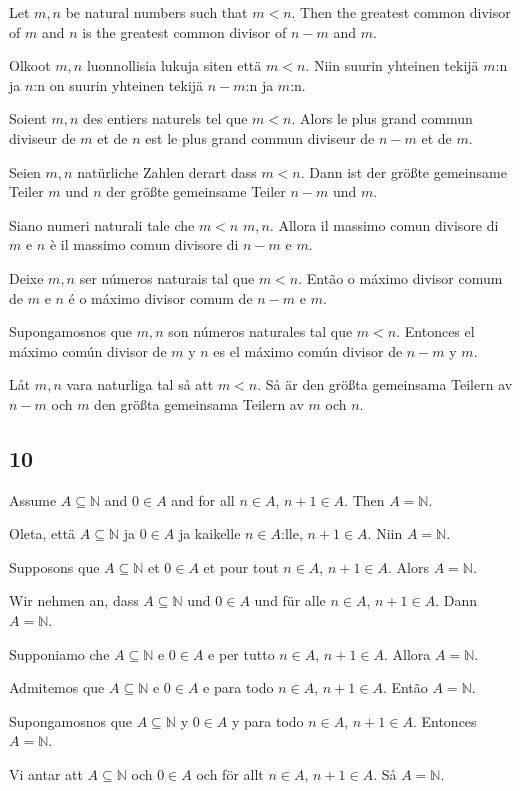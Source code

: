 \documentclass{article}
\begin{document}
Let $ m, n $ be natural numbers such that $ m < n $. Then the greatest common divisor of $ m $ and $ n $ is the greatest common divisor of $ n-m $ and $ m $.

Olkoot $ m, n $ luonnollisia lukuja siten että $ m < n $. Niin suurin yhteinen tekijä $ m $:n ja $ n $:n on suurin yhteinen tekijä $ n-m $:n ja $ m $:n.

Soient $ m, n $ des entiers naturels tel que $ m < n $. Alors le plus grand commun diviseur de $ m $ et de $ n $ est le plus grand commun diviseur de $ n-m $ et de $ m $.

Seien $ m, n $ natürliche Zahlen derart dass $ m < n $. Dann ist der größte gemeinsame Teiler $ m $ und $ n $ der größte gemeinsame Teiler $ n-m $ und $ m $.

Siano numeri naturali tale che $ m < n $ $ m, n $. Allora il massimo comun divisore di $ m $ e $ n $ è il massimo comun divisore di $ n-m $ e $ m $.

Deixe $ m, n $ ser números naturais tal que $ m < n $. Então o máximo divisor comum de $ m $ e $ n $ é o máximo divisor comum de $ n-m $ e $ m $.

Supongamosnos que $ m, n $ son números naturales tal que $ m < n $. Entonces el máximo común divisor de $ m $ y $ n $ es el máximo común divisor de $ n-m $ y $ m $.

Låt $ m, n $ vara naturliga tal så att $ m < n $. Så är den größta gemeinsama Teilern av $ n-m $ och $ m $ den größta gemeinsama Teilern av $ m $ och $ n $.

\subsection*{10}

Assume $ A \subseteq \mathbb{N} $ and $ 0 \in A $ and for all $ n \in A $, $ n + 1 \in A $. Then $ A = \mathbb{N} $.

Oleta, että $ A \subseteq \mathbb{N} $ ja $ 0 \in A $ ja kaikelle $ n \in A $:lle, $ n + 1 \in A $. Niin $ A = \mathbb{N} $.

Supposons que $ A \subseteq \mathbb{N} $ et $ 0 \in A $ et pour tout $ n \in A $, $ n + 1 \in A $. Alors $ A = \mathbb{N} $.

Wir nehmen an, dass $ A \subseteq \mathbb{N} $ und $ 0 \in A $ und für alle $ n \in A $, $ n + 1 \in A $. Dann $ A = \mathbb{N} $.

Supponiamo che $ A \subseteq \mathbb{N} $ e $ 0 \in A $ e per tutto $ n \in A $, $ n + 1 \in A $. Allora $ A = \mathbb{N} $.

Admitemos que $ A \subseteq \mathbb{N} $ e $ 0 \in A $ e para todo $ n \in A $, $ n + 1 \in A $. Então $ A = \mathbb{N} $.

Supongamosnos que $ A \subseteq \mathbb{N} $ y $ 0 \in A $ y para todo $ n \in A $, $ n + 1 \in A $. Entonces $ A = \mathbb{N} $.

Vi antar att $ A \subseteq \mathbb{N} $ och $ 0 \in A $ och för allt $ n \in A $, $ n + 1 \in A $. Så $ A = \mathbb{N} $.
\end{document}
